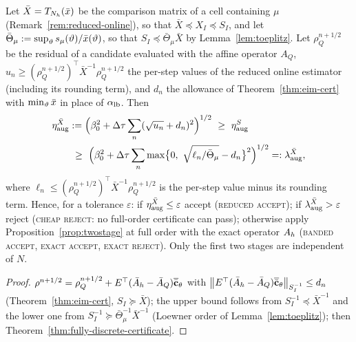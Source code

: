 \begin{proposition}\label{prop:threestage}
Let $\bar X=T_{N_h}(\bar{x})$ be the comparison matrix of a cell containing $\mu$
(Remark~\ref{rem:reduced-online}), so that $\bar X\preceq X_I\preceq S_I$, and let
$\bar\Theta_\mu:=\sup_\vartheta s_\mu(\vartheta)/\bar{x}(\vartheta)$, so that
$S_I\preceq\bar\Theta_\mu\bar X$ by Lemma~\ref{lem:toeplitz}.  Let $\rho_Q^{n+1/2}$ be the residual of a
candidate evaluated with the affine operator $A_Q$, $u_n\ge(\rho_Q^{n+1/2})^\top\bar X^{-1}\rho_Q^{n+1/2}$
the per-step values of the reduced online estimator (including its rounding term), and $d_n$ the
allowance of Theorem~\ref{thm:eim-cert} with $\min_\vartheta\bar{x}$ in place of $\alpha_{\rm lb}$.  Then
\begin{align*}
 \eta^{\bar X}_{\rm aug}&:=\Bigl(\beta_0^2+\dt\sum_n(\sqrt{u_n}+d_n)^2\Bigr)^{1/2}\ \ge\ \eta^S_{\rm aug}\\
 &\ \ge\ \Bigl(\beta_0^2+\dt\sum_n\max\bigl\{0,\ \sqrt{\ell_n/\bar\Theta_\mu}-d_n\bigr\}^2\Bigr)^{1/2}=:\lambda^{\bar X}_{\rm aug},
\end{align*}
where $\ell_n\le(\rho_Q^{n+1/2})^\top\bar X^{-1}\rho_Q^{n+1/2}$ is the per-step value minus its rounding
term.  Hence, for a tolerance $\varepsilon$: if $\eta^{\bar X}_{\rm aug}\le\varepsilon$ accept
(\textsc{reduced accept}); if $\lambda^{\bar X}_{\rm aug}>\varepsilon$ reject (\textsc{cheap reject}:
no full-order certificate can pass); otherwise apply Proposition~\ref{prop:twostage} at full order
with the exact operator $A_h$ (\textsc{banded accept}, \textsc{exact accept}, \textsc{exact reject}).
Only the first two stages are independent of $N$.
\end{proposition}
\begin{proof}
$\rho^{n+1/2}=\rho_Q^{n+1/2}+E^\top(\bar A_h-\bar A_Q)\overline{\bar{\mathbf c}}_\theta$ with
$\left\lVert E^\top(\bar A_h-\bar A_Q)\overline{\bar{\mathbf c}}_\theta\right\rVert_{S_I^{-1}}\le d_n$ (Theorem~\ref{thm:eim-cert},
$S_I\succeq\bar X$); the upper bound follows from $S_I^{-1}\preceq\bar X^{-1}$ and the lower one from
$S_I^{-1}\succeq\bar\Theta_\mu^{-1}\bar X^{-1}$ (Loewner order of Lemma~\ref{lem:toeplitz}); then
Theorem~\ref{thm:fully-discrete-certificate}.
\end{proof}
